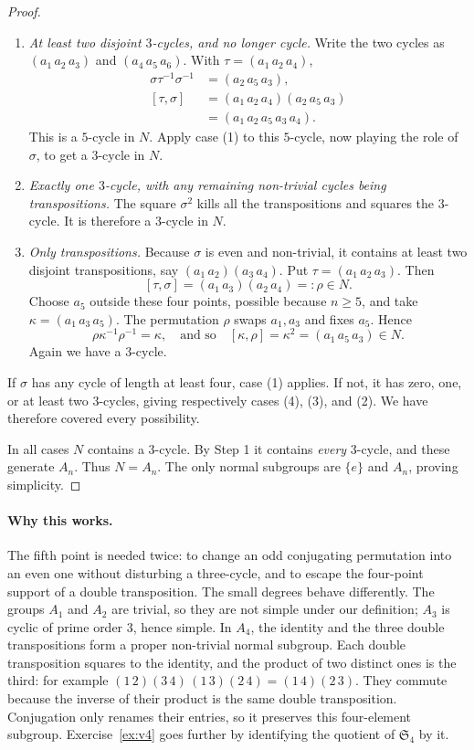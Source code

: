 \begin{proof}
\begin{enumerate}[label=(\arabic*)]
\item \emph{At least two disjoint $3$-cycles,
and no longer cycle.}
Write the two cycles as
$(a_1\,a_2\,a_3)$ and
$(a_4\,a_5\,a_6)$.
With $\tau=(a_1\,a_2\,a_4)$,
\[
\begin{aligned}
\sigma\tau^{-1}\sigma^{-1}
 &=(a_2\,a_5\,a_3),\\
[\tau,\sigma]
 &=(a_1\,a_2\,a_4)(a_2\,a_5\,a_3)\\
 &=(a_1\,a_2\,a_5\,a_3\,a_4).
\end{aligned}
\]
This is a $5$-cycle in $N$.
Apply case (1) to this $5$-cycle, now
playing the role of $\sigma$, to get
a $3$-cycle in $N$.

\item \emph{Exactly one $3$-cycle,
with any remaining non-trivial cycles
being transpositions.}
The square $\sigma^2$ kills all the
transpositions and squares the $3$-cycle.
It is therefore a $3$-cycle in $N$.

\item \emph{Only transpositions.}
Because $\sigma$ is even and non-trivial,
it contains at least two disjoint transpositions,
say $(a_1\,a_2)(a_3\,a_4)$.
Put $\tau=(a_1\,a_2\,a_3)$. Then
\[
[\tau,\sigma]
=(a_1\,a_3)(a_2\,a_4)=:\rho\in N.
\]
Choose $a_5$ outside these four points,
possible because $n\ge5$, and take
$\kappa=(a_1\,a_3\,a_5)$.
The permutation $\rho$ swaps $a_1,a_3$
and fixes $a_5$. Hence
\[
\rho\kappa^{-1}\rho^{-1}=\kappa,
\quad\text{and so}\quad
[\kappa,\rho]=\kappa^2
=(a_1\,a_5\,a_3)\in N.
\]
Again we have a $3$-cycle.
\end{enumerate}

If $\sigma$ has any cycle of length at least four,
case (1) applies. If not, it has zero, one,
or at least two $3$-cycles, giving respectively
cases (4), (3), and (2). We have therefore
covered every possibility.

In all cases $N$ contains a $3$-cycle.
By Step 1 it contains \emph{every} $3$-cycle,
and these generate $A_n$. Thus $N=A_n$.
The only normal subgroups are $\{e\}$ and
$A_n$, proving simplicity.
\end{proof}

\paragraph{Why this works.}
The fifth point is needed twice: to change an odd conjugating permutation into an even one without disturbing a three-cycle, and to escape the four-point support of a double transposition. The small degrees behave differently. The groups $A_1$ and $A_2$ are trivial, so they are not simple under our definition; $A_3$ is cyclic of prime order $3$, hence simple. In $A_4$, the identity and the three double transpositions form a proper non-trivial normal subgroup. Each double transposition squares to the identity, and the product of two distinct ones is the third: for example $(1\,2)(3\,4)\,(1\,3)(2\,4)=(1\,4)(2\,3)$. They commute because the inverse of their product is the same double transposition. Conjugation only renames their entries, so it preserves this four-element subgroup. Exercise~\ref{ex:v4} goes further by identifying the quotient of $\mathfrak S_4$ by it.

